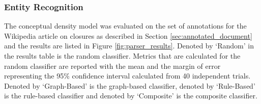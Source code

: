 \documentclass[12pt]{article}
\theoremstyle{grammarstyle}
\begin{document}
\subsubsection{Entity Recognition} \label{sec:entity_recognition_results}
The conceptual density model was evaluated on the set of annotations for the Wikipedia article on closures as described in Section \ref{sec:annotated_document} and the results are listed in Figure \ref{fig:parser_results}.
Denoted by `Random' in the results table is the random classifier.
Metrics that are calculated for the random classifier are reported with the mean and the margin of error representing the 95\% confidence interval calculated from 40 independent trials.
Denoted by `Graph-Based' is the graph-based classifier, denoted by `Rule-Based' is the rule-based classifier and denoted by `Composite' is the composite classifier.
\end{document}
